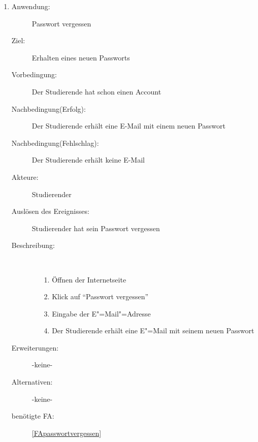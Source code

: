 \documentclass[parskip=full]{scrartcl}
\newcommand{\swtLabel}[1]{\textbf{/#1\arabic*0/}}
\begin{document}
\begin{enumerate}[label=\swtLabel{S}]
  \item \label{UCstudNewPasswort}
    \begin{description}
  	\item[Anwendung:] Passwort vergessen
  	\item[Ziel:] Erhalten eines neuen Passworts
  	\item[Vorbedingung:] Der Studierende hat schon einen Account
  	\item[Nachbedingung(Erfolg):] Der Studierende erhält eine E-Mail mit einem
  	neuen Passwort
  	\item[Nachbedingung(Fehlschlag):] Der Studierende erhält keine E-Mail
  	\item[Akteure:] Studierender
  	\item[Auslösen des Ereignisses:] Studierender hat sein Passwort vergessen
  	\item[Beschreibung:]~
  	\begin{enumerate}
  	  \item[1.] Öffnen der Internetseite
      \item[2.] Klick auf \enquote{Passwort vergessen}
      \item[3.] Eingabe der E"=Mail"=Adresse
      \item[4.] Der Studierende erhält eine E"=Mail mit seinem neuen Passwort
  	\end{enumerate}
  	\item[Erweiterungen:] -keine-
  	\item[Alternativen:] -keine-
  	\item[benötigte FA:] \ref{FApasswortvergessen}
  \end{description}
  

\end{enumerate}
\end{document}
